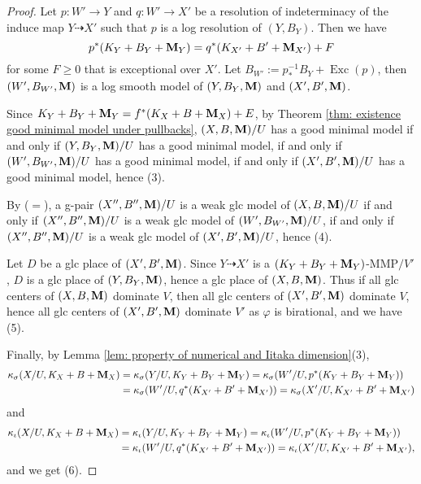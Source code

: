 \documentclass[11pt]{amsart}
\numberwithin{equation}{section}
\newcommand{\Mm}{{\bf{M}}}
\newcommand{\Exc}{\operatorname{Exc}}
\theoremstyle{definition}
\theoremstyle{definition}
\theoremstyle{definition}
\begin{document}
\begin{proof}
Let $p: W'\rightarrow Y$ and $q: W'\rightarrow X'$ be a resolution of indeterminacy of the induce map $Y\dashrightarrow X'$ such that $p$ is a log resolution of $(Y,B_Y)$. Then we have
$$p^*(K_Y+B_Y+\Mm_Y)=q^*(K_{X'}+B'+\Mm_{X'})+F$$
for some $F\geq 0$ that is exceptional over $X'$. Let $B_{W'}:=p^{-1}_*B_Y+\Exc(p)$, then $(W',B_{W'},\Mm)$ is a log smooth model of $(Y,B_Y,\Mm)$ and $(X',B',\Mm)$.

Since $K_Y+B_Y+\Mm_Y=f^*(K_{X}+B+\Mm_{X})+E$, by Theorem \ref{thm: existence good minimal model under pullbacks}, $(X,B,\Mm)/U$ has a good minimal model if and only if $(Y,B_Y,\Mm)/U$ has a good minimal model, if and only if $(W',B_{W'},\Mm)/U$ has a good minimal model, if and only if $(X',B',\Mm)/U$ has a good minimal model, hence (3).




By \cite[Lemmas 3.6, 3.10(1)]{HL21} ($=$\cite[Version 3, Lemmas 3.10, 3.17]{HL21}), a g-pair $(X'',B'',\Mm)/U$ is a weak glc model of $(X,B,\Mm)/U$ if and only if $(X'',B'',\Mm)/U$ is a weak glc model of $(W',B_{W'},\Mm)/U$, if and only if $(X'',B'',\Mm)/U$ is a weak glc model of $(X',B',\Mm)/U$, hence (4).

Let $D$ be a glc place of $(X',B',\Mm)$. Since $Y\dashrightarrow X'$ is a $(K_{Y}+B_Y+\Mm_Y)$-MMP$/V'$, $D$ is a glc place of $(Y,B_Y,\Mm)$, hence a glc place of $(X,B,\Mm)$. Thus if all glc centers of $(X,B,\Mm)$ dominate $V$, then all glc centers of $(X',B',\Mm)$ dominate $V$, hence all glc centers of $(X',B',\Mm)$ dominate $V'$ as $\varphi$ is birational, and we have (5). 

Finally, by Lemma \ref{lem: property of numerical and Iitaka dimension}(3), 
\begin{align*}
    \kappa_{\sigma}(X/U,K_X+B+\Mm_X)&=\kappa_{\sigma}(Y/U,K_Y+B_Y+\Mm_Y)=\kappa_{\sigma}(W'/U,p^*(K_Y+B_Y+\Mm_Y))\\
    &=\kappa_{\sigma}(W'/U,q^*(K_{X'}+B'+\Mm_{X'}))=\kappa_{\sigma}(X'/U,K_{X'}+B'+\Mm_{X'})
\end{align*}
and
\begin{align*}
    \kappa_{\iota}(X/U,K_X+B+\Mm_X)&=\kappa_{\iota}(Y/U,K_Y+B_Y+\Mm_Y)=\kappa_{\iota}(W'/U,p^*(K_Y+B_Y+\Mm_Y))\\
    &=\kappa_{\iota}(W'/U,q^*(K_{X'}+B'+\Mm_{X'}))=\kappa_{\iota}(X'/U,K_{X'}+B'+\Mm_{X'}),
\end{align*}
and we get (6).
\end{proof}
\end{document}
